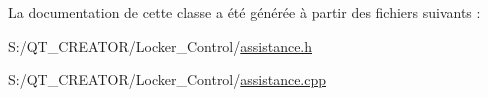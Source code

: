 La documentation de cette classe a été générée à partir des fichiers suivants \+:\begin{DoxyCompactItemize}
\item 
S\+:/\+Q\+T\+\_\+\+C\+R\+E\+A\+T\+O\+R/\+Locker\+\_\+\+Control/\hyperlink{assistance_8h}{assistance.\+h}\item 
S\+:/\+Q\+T\+\_\+\+C\+R\+E\+A\+T\+O\+R/\+Locker\+\_\+\+Control/\hyperlink{assistance_8cpp}{assistance.\+cpp}\end{DoxyCompactItemize}
